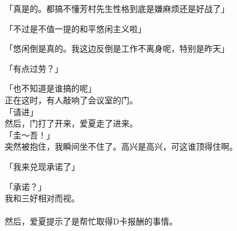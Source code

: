 「真是的。都搞不懂芳村先生性格到底是嫌麻烦还是好战了」

「不过是不值一提的和平悠闲主义啦」

「悠闲倒是真的。我这边反倒是工作不离身呢，特别是昨天」

「有点过劳？」

「也不知道是谁搞的呢」\\

正在这时，有人敲响了会议室的门。\\

「请进」\\

然后，门打了开来，爱夏走了进来。\\

「圭～吾！」\\

突然被抱住，我瞬间坐不住了。高兴是高兴，可这谁顶得住啊。\\


「我来兑现承诺了」

「承诺？」\\

我和三好相对而视。\\

\\

然后，爱夏提示了是帮忙取得D卡报酬的事情。\\

